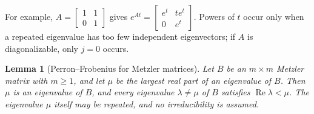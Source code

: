 \documentclass[11pt]{article}
\newtheorem{lemma}[theorem]{Lemma}
\theoremstyle{definition}
\theoremstyle{remark}
\renewcommand{\Re}{\operatorname{Re}}
\begin{document}
For example, $A = \begin{bmatrix} 1 & 1 \\ 0 & 1 \end{bmatrix}$ gives
$e^{At} = \begin{bmatrix} e^{t} & t e^{t} \\ 0 & e^{t} \end{bmatrix}$. Powers of $t$ occur only
when a repeated eigenvalue has too few independent eigenvectors; if $A$ is diagonalizable, only
$j = 0$ occurs.

\begin{lemma}[Perron--Frobenius for Metzler matrices]\label{lem:PF}
Let $B$ be an $m \times m$ Metzler matrix with $m \ge 1$, and let $\mu$ be the largest real part
of an eigenvalue of $B$. Then
$\mu$ is an eigenvalue of $B$, and every eigenvalue $\lambda \ne \mu$ of $B$ satisfies
$\Re\lambda < \mu$. The eigenvalue $\mu$ itself may be repeated, and no irreducibility is assumed.
\end{lemma}
\end{document}
